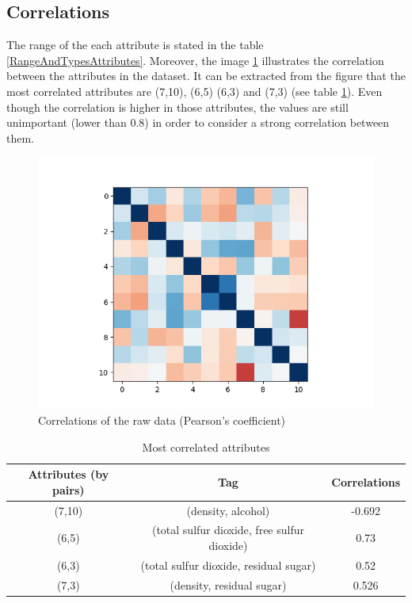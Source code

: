 \documentclass[twoside,a4paper,12pt]{report}
\begin{document}
\subsection{Correlations}
The range of the each attribute is stated in the table \ref{RangeAndTypesAttributes}.
Moreover, the image \ref{CorrelationRaw} illustrates the correlation between the attributes in the dataset. 
It can be extracted from the figure that the most correlated attributes are (7,10), (6,5) (6,3) and 
(7,3) (see table \ref{ResumeCorrelation}).  Even though the correlation is higher in those attributes,
 the values are still unimportant (lower than 0.8) in order to consider a strong correlation between them.



\begin{figure}
    \centering
    \includegraphics[width=1\textwidth,height=0.5\textheight]{correlation_no_transformation.png}
    \caption{Correlations of the raw data (Pearson's coefficient)}
     \label{CorrelationRaw} 
\end{figure}

\begin{table}
    \centering
    \begin{tabular}{|| c|c|c||}
          \hline \hline
         Attributes (by pairs) & Tag & Correlations  \\
         \hline \hline
         (7,10) & (density, alcohol) & -0.692\\
         \hline
         (6,5) & (total sulfur dioxide, free sulfur dioxide) & 0.73  \\
         \hline
         (6,3) & (total sulfur dioxide, residual sugar) & 0.52 \\
         \hline
         (7,3) & (density, residual sugar) &0.526 \\
         \hline  \hline
    \end{tabular}
    \caption{Most correlated attributes     \label{ResumeCorrelation}
    }
\end{table}
\end{document}
